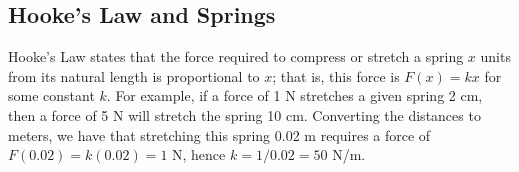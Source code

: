 \subsection*{Hooke's Law and Springs}

Hooke's Law states that the force required to compress or stretch a spring $x$ units from its natural length is proportional to $x$; that is, this force is $F(x) = kx$ for some constant $k$. For example, if a force of 1 N stretches a given spring 2 cm, then a force of 5 N will stretch the spring 10 cm. Converting the distances to meters, we have that stretching this spring 0.02 m requires a force of $F(0.02) = k(0.02) = 1$ N, hence $k = 1/0.02 = 50$ N/m. 


